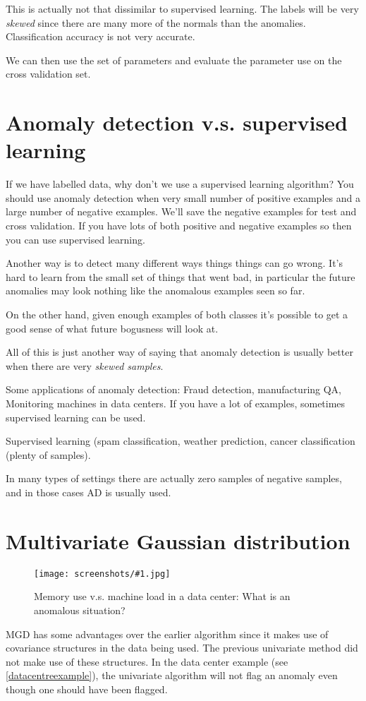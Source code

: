 \documentclass[a4, 12pt, english, USenglish]{scrreprt}
\newcommand{\screenshot}[2]{
\begin{figure}[htb]
\texttt{[image: screenshots/\#1.jpg]}
\label{#1}
\caption{#2}
\end{figure}}
\newcommand{\idx}[1]{{\em #1}\index{#1}}
\begin{document}
This is actually not that dissimilar to supervised learning.  The
labels will be very \idx{skewed} since there are many more of the
normals than the anomalies.  Classification accuracy is not very
accurate.

We can then use the set of parameters and evaluate the parameter use
on the cross validation set.

\section{Anomaly detection v.s. supervised learning}

If we have labelled data, why don't we use a supervised learning
algorithm?  You should use anomaly detection when very small number of
positive examples and a large number of negative examples.  We'll save
the negative examples for test and cross validation.  If you have lots
of both positive and negative examples so then you can use supervised
learning.

Another way is to detect many different ways things  things can go
wrong.  It's hard to learn from the small set of things that went bad,
in particular the future anomalies may look  nothing like the
anomalous examples seen so far.

On the other hand, given enough examples of both classes  it's
possible to get a good sense of what future bogusness will look at.   

All of this is just another way of saying that anomaly detection is
usually better when there are very \idx{skewed samples}.

Some applications of anomaly detection: Fraud detection, manufacturing
QA, Monitoring machines in data centers.   If you have a lot of
examples, sometimes supervised learning can be used.

Supervised learning (spam classification, weather prediction, cancer
classification (plenty of samples).  

In many types of settings there are actually zero samples of negative
samples, and in those cases AD is usually used.

\section{Multivariate Gaussian distribution}

\screenshot{datacenterexample}{Memory use v.s. machine load in a data
  center: What is an anomalous situation?}

MGD has some advantages over the earlier algorithm since it makes use
of covariance structures in the data being used.   The previous
univariate method did not make use of these structures.   In  the data
center example (see \ref{datacentreexample}), the univariate algorithm
will not flag an anomaly even though one should have been flagged.
\end{document}
